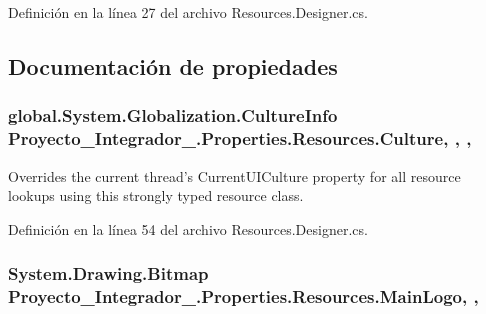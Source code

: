 Definición en la línea 27 del archivo Resources.\-Designer.\-cs.



\subsection{Documentación de propiedades}
\hypertarget{class_proyecto___integrador__3_1_1_properties_1_1_resources_a421bcb61c1d793352db976854d00c18f}{
\subsubsection[{Culture}]{\setlength{\rightskip}{0pt plus 5cm}global.\-System.\-Globalization.\-Culture\-Info Proyecto\-\_\-\-Integrador\-\_.\-Properties.\-Resources.\-Culture\hspace{0.3cm}{\ttfamily [static]}, {\ttfamily [get]}, {\ttfamily [set]}, {\ttfamily [package]}}}\label{class_proyecto___integrador__3_1_1_properties_1_1_resources_a421bcb61c1d793352db976854d00c18f}


Overrides the current thread's Current\-U\-I\-Culture property for all resource lookups using this strongly typed resource class. 



Definición en la línea 54 del archivo Resources.\-Designer.\-cs.

\hypertarget{class_proyecto___integrador__3_1_1_properties_1_1_resources_a0db6781e266a9081ff4ac23d713ea0c1}{
\subsubsection[{Main\-Logo}]{\setlength{\rightskip}{0pt plus 5cm}System.\-Drawing.\-Bitmap Proyecto\-\_\-\-Integrador\-\_.\-Properties.\-Resources.\-Main\-Logo\hspace{0.3cm}{\ttfamily [static]}, {\ttfamily [get]}, {\ttfamily [package]}}}\label{class_proyecto___integrador__3_1_1_properties_1_1_resources_a0db6781e266a9081ff4ac23d713ea0c1}


